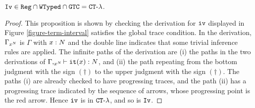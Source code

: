 \begin{proposition}
 \label{proposition-interval-in-CT-lambda}
${\tt Iv} \in {\tt Reg} \cap {\tt WTyped} \cap {\tt GTC} = { {\tt CT}\mbox{-}\lambda}$.
\end{proposition}

\begin{proof}
This proposition is shown by checking the derivation for ${\tt iv}$
displayed in Figure \ref{figure-term-interval} satisfies
the global trace condition. 
In the derivation, $\Gamma_{x^{N}}$ is $\Gamma$ with $x:{N}$ and the double line indicates that some trivial inference rules are applied.
The infinite paths of the derivation are
(i) the paths in the two derivations of $\Gamma,_{x^{N}}\vdash {\tt it}(x):{N}$, and
(ii) the path repeating from the bottom judgment with the sign $(\dagger)$ to the upper judgment with the sign $(\dagger)$.
The paths (i) are already checked to have progressing traces,
and the path (ii) has a progressing trace indicated by the sequence of arrows, whose progressing point is the red arrow.
Hence ${\tt iv}$ is in ${ {\tt CT}\mbox{-}\lambda}$, and so is ${\tt Iv}$. 
\end{proof}


